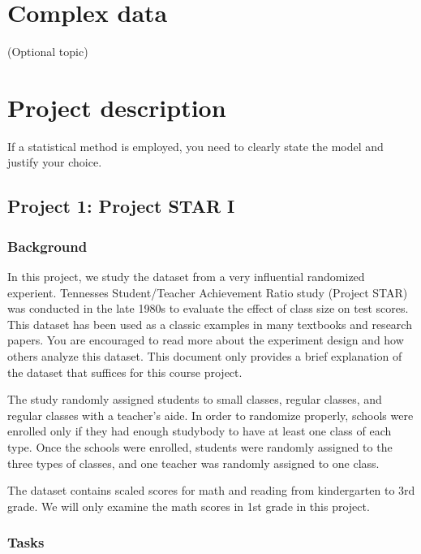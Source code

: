 \documentclass[12pt,]{book}
\begin{document}
\chapter{Complex data}\label{ch:dim}

(Optional topic)

\chapter{Project description}\label{ch:proj}

If a statistical method is employed, you need to clearly state the model
and justify your choice.

\section{Project 1: Project STAR I}\label{project-1-project-star-i}

\subsection{Background}\label{background}

In this project, we study the dataset from a very influential randomized
experient. Tennesses Student/Teacher Achievement Ratio study (Project
STAR) was conducted in the late 1980s to evaluate the effect of class
size on test scores. This dataset has been used as a classic examples in
many textbooks and research papers. You are encouraged to read more
about the experiment design and how others analyze this dataset. This
document only provides a brief explanation of the dataset that suffices
for this course project.

The study randomly assigned students to small classes, regular classes,
and regular classes with a teacher's aide. In order to randomize
properly, schools were enrolled only if they had enough studybody to
have at least one class of each type. Once the schools were enrolled,
students were randomly assigned to the three types of classes, and one
teacher was randomly assigned to one class.

The dataset contains scaled scores for math and reading from
kindergarten to 3rd grade. We will only examine the math scores in 1st
grade in this project.

\subsection{Tasks}\label{tasks}
\end{document}
